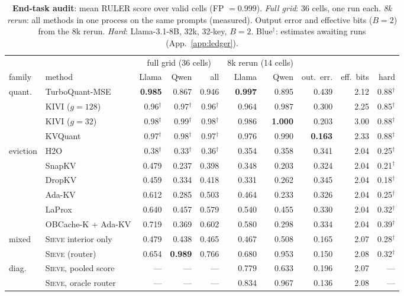 \documentclass{article}
\newcommand{\est}[1]{{\color{estcol}#1$^{\dagger}$}}
\newcommand{\sieve}{\textsc{Sieve}}
\theoremstyle{definition}
\begin{document}
\begin{table}[t]
\centering
\footnotesize
\setlength{\tabcolsep}{2.6pt}
\caption{\textbf{End-task audit}: mean RULER score over valid cells (FP $=0.999$). \emph{Full grid}: 36 cells, one run each. \emph{8k rerun}: all methods in one process on the same prompts (measured). Output error and effective bits ($B=2$) from the 8k rerun. \emph{Hard}: Llama-3.1-8B, 32k, 32-key, $B=2$. \est{Blue}: estimates awaiting runs (App.~\ref{app:ledger}).}
\label{tab:endtask}
\begin{tabular}{@{}llrrrrrrrr@{}}
\toprule
& & \multicolumn{3}{c}{full grid (36 cells)} & \multicolumn{2}{c}{8k rerun (14 cells)} & & & \\
\cmidrule(lr){3-5}\cmidrule(lr){6-7}
family & method & Llama & Qwen & all & Llama & Qwen & out.\ err. & eff.\ bits & hard \\
\midrule
\multirow{4}{*}{quant.} & TurboQuant-MSE & \textbf{0.985} & 0.867 & 0.946 & \textbf{0.997} & 0.895 & 0.439 & 2.12 & \est{0.88} \\
 & KIVI ($g{=}128$) & \est{0.96} & \est{0.97} & \est{0.96} & 0.964 & 0.987 & 0.300 & 2.25 & \est{0.85} \\
 & KIVI ($g{=}32$) & \est{0.98} & \est{0.99} & \est{0.98} & 0.986 & \textbf{1.000} & 0.203 & 3.00 & \est{0.88} \\
 & KVQuant & \est{0.97} & \est{0.98} & \est{0.97} & 0.976 & 0.990 & \textbf{0.163} & 2.33 & \est{0.88} \\
\midrule
\multirow{6}{*}{eviction} & H2O & \est{0.38} & \est{0.33} & \est{0.36} & 0.354 & 0.358 & 0.341 & 2.04 & \est{0.25} \\
 & SnapKV & 0.479 & 0.237 & 0.398 & 0.348 & 0.203 & 0.324 & 2.04 & \est{0.21} \\
 & DropKV & 0.459 & 0.334 & 0.418 & 0.331 & 0.262 & 0.345 & 2.04 & \est{0.18} \\
 & Ada-KV & 0.612 & 0.285 & 0.503 & 0.464 & 0.233 & 0.326 & 2.04 & \est{0.25} \\
 & LaProx & 0.640 & 0.457 & 0.579 & 0.540 & 0.455 & 0.330 & 2.04 & \est{0.32} \\
 & OBCache-K + Ada-KV & 0.719 & 0.369 & 0.602 & 0.580 & 0.298 & 0.334 & 2.04 & \est{0.39} \\
\midrule
\multirow{2}{*}{mixed} & \sieve{} interior only & 0.479 & 0.438 & 0.465 & 0.467 & 0.508 & 0.165 & 2.07 & \est{0.28} \\
 & \sieve{} (router) & 0.654 & \textbf{0.989} & 0.766 & 0.680 & 0.953 & 0.150 & 2.08 & \est{0.32} \\
\midrule
\multirow{2}{*}{diag.} & \sieve{}, pooled score & --- & --- & --- & 0.779 & 0.633 & 0.196 & 2.07 & --- \\
 & \sieve{}, oracle router & --- & --- & --- & 0.834 & 0.967 & 0.136 & 2.08 & --- \\
\bottomrule
\end{tabular}
\vspace{-2mm}
\end{table}
\end{document}

